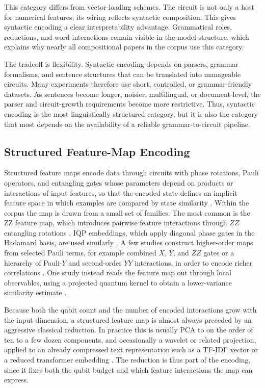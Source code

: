 \documentclass{ieeeaccess}
\begin{document}
This category differs from vector-loading schemes. The circuit is not only a host for numerical features; its wiring reflects syntactic composition. This gives syntactic encoding a clear interpretability advantage. Grammatical roles, reductions, and word interactions remain visible in the model structure, which explains why nearly all compositional papers in the corpus use this category.

The tradeoff is flexibility. Syntactic encoding depends on parsers, grammar formalisms, and sentence structures that can be translated into manageable circuits. Many experiments therefore use short, controlled, or grammar-friendly datasets. As sentences become longer, noisier, multilingual, or document-level, the parser and circuit-growth requirements become more restrictive. Thus, syntactic encoding is the most linguistically structured category, but it is also the category that most depends on the availability of a reliable grammar-to-circuit pipeline.

\subsection{Structured Feature-Map Encoding}
\label{subsec:iqp_encoding}

Structured feature maps encode data through circuits with phase rotations, Pauli operators, and entangling gates whose parameters depend on products or interactions of input features, so that the encoded state defines an implicit feature space in which examples are compared by state similarity \cite{schuld2019quantum}. Within the corpus the map is drawn from a small set of families. The most common is the ZZ feature map, which introduces pairwise feature interactions through $ZZ$ entangling rotations \cite{widdows_near-term_2024,baik_neural_2025,sunkavalli_experimentation_2024}. IQP embeddings, which apply diagonal phase gates in the Hadamard basis, are used similarly \cite{djemmal_arabert-qc_2025,ruskanda_quantum-enhanced_2023}. A few studies construct higher-order maps from selected Pauli terms, for example combined $X$, $Y$, and $ZZ$ gates or a hierarchy of Pauli-$Y$ and second-order $YY$ interactions, in order to encode richer correlations \cite{katyayan_supervised_2023,ruskanda_quantum-enhanced_2023}. One study instead reads the feature map out through local observables, using a projected quantum kernel to obtain a lower-variance similarity estimate \cite{keith-norambuena_quantum_2026}.

Because both the qubit count and the number of encoded interactions grow with the input dimension, a structured feature map is almost always preceded by an aggressive classical reduction. In practice this is usually PCA to on the order of ten to a few dozen components, and occasionally a wavelet or related projection, applied to an already compressed text representation such as a TF-IDF vector or a reduced transformer embedding \cite{mohammad_masum_hybrid_2023,djemmal_arabert-qc_2025,jagatheesan_quantum_2026}. The reduction is thus part of the encoding, since it fixes both the qubit budget and which feature interactions the map can express.
\end{document}
